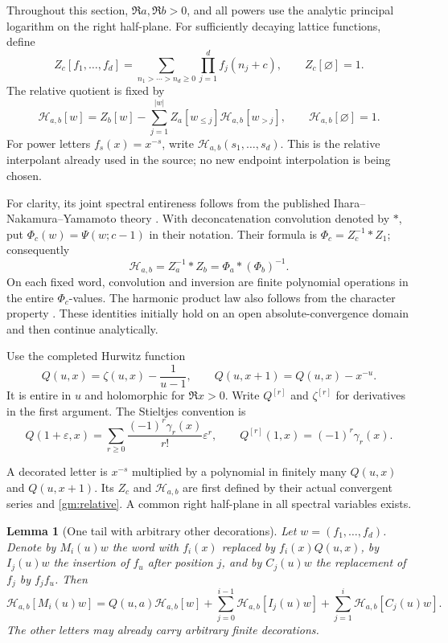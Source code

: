 \documentclass[11pt,a4paper]{article}
\numberwithin{equation}{section}
\newtheorem{lemma}[theorem]{Lemma}
\theoremstyle{definition}
\theoremstyle{remark}
\begin{document}
Throughout this section, \(\Re a,\Re b>0\), and all powers use the
analytic principal logarithm on the right half-plane.  For sufficiently
decaying lattice functions, define
\[
 Z_c[f_1,\ldots,f_d]
 =\sum_{n_1>\cdots>n_d\ge0}\prod_{j=1}^df_j(n_j+c),
 \qquad Z_c[\varnothing]=1.
\]
The relative quotient is fixed by
\begin{equation}\label{gm:relative}
 \mathcal H_{a,b}[w]
 =Z_b[w]-\sum_{j=1}^{|w|}Z_a[w_{\le j}]
                                  \mathcal H_{a,b}[w_{>j}],
 \qquad \mathcal H_{a,b}[\varnothing]=1.
\end{equation}
For power letters \(f_s(x)=x^{-s}\), write
\(\mathcal H_{a,b}(s_1,\ldots,s_d)\).  This is the relative
interpolant already used in the source; no new endpoint interpolation is
being chosen.

For clarity, its joint spectral entireness follows from the published
Ihara--Nakamura--Yamamoto theory \cite[Corollary~4.2 and
Proposition~5.3]{gm:INY}.  With deconcatenation convolution denoted by
\(*\), put \(\Phi_c(w)=\Psi(w;c-1)\) in their notation.  Their
formula is \(\Phi_c=Z_c^{-1}*Z_1\); consequently
\[
 \mathcal H_{a,b}=Z_a^{-1}*Z_b=\Phi_a*(\Phi_b)^{-1}.
\]
On each fixed word, convolution and inversion are finite polynomial
operations in the entire \(\Phi_c\)-values.  The harmonic product law
also follows from the character property
\cite[Theorem~5.2]{gm:INY}.  These identities initially hold on an open
absolute-convergence domain and then continue analytically.

Use the completed Hurwitz function
\begin{equation}\label{gm:Q}
 Q(u,x)=\zeta(u,x)-\frac1{u-1},\qquad
 Q(u,x+1)=Q(u,x)-x^{-u}.
\end{equation}
It is entire in \(u\) and holomorphic for \(\Re x>0\).
Write \(Q^{[r]}\) and \(\zeta^{[r]}\) for derivatives in the first
argument.  The Stieltjes convention is
\begin{equation}\label{gm:stieltjes}
 Q(1+\varepsilon,x)
  =\sum_{r\ge0}\frac{(-1)^r\gamma_r(x)}{r!}\varepsilon^r,
 \qquad Q^{[r]}(1,x)=(-1)^r\gamma_r(x).
\end{equation}

A decorated letter is \(x^{-s}\) multiplied by a polynomial in
finitely many \(Q(u,x)\) and \(Q(u,x+1)\).  Its \(Z_c\) and
\(\mathcal H_{a,b}\) are first defined by their actual convergent
series and \eqref{gm:relative}.  A common right half-plane in all
spectral variables exists.

\begin{lemma}[One tail with arbitrary other decorations]
\label{gm:one-tail}
Let \(w=(f_1,\ldots,f_d)\).  Denote by \(M_i(u)w\) the word with
\(f_i(x)\) replaced by \(f_i(x)Q(u,x)\), by \(I_j(u)w\) the
insertion of \(f_u\) after position \(j\), and by \(C_j(u)w\) the
replacement of \(f_j\) by \(f_jf_u\).  Then
\begin{equation}\label{gm:insertion}
 \mathcal H_{a,b}[M_i(u)w]
 =Q(u,a)\mathcal H_{a,b}[w]
  +\sum_{j=0}^{i-1}\mathcal H_{a,b}[I_j(u)w]
  +\sum_{j=1}^{i}\mathcal H_{a,b}[C_j(u)w].
\end{equation}
The other letters may already carry arbitrary finite decorations.
\end{lemma}
\end{document}
